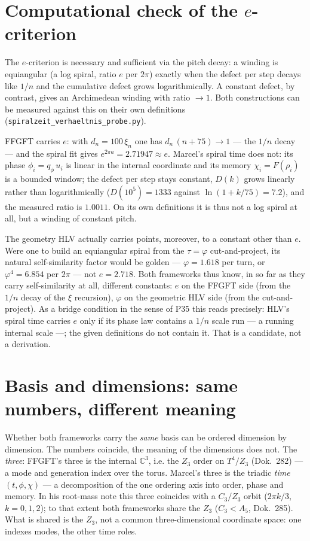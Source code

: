\section{Computational check of the $e$-criterion}
The $e$-criterion is necessary and sufficient via the pitch decay: a winding is equiangular (a log
spiral, ratio $e$ per $2\pi$) exactly when the defect per step decays like $1/n$ and the cumulative
defect grows logarithmically. A constant defect, by contrast, gives an Archimedean winding with
ratio $\to1$. Both constructions can be measured against this on their own definitions
(\texttt{spiralzeit\_verhaeltnis\_probe.py}).

FFGFT carries $e$: with $d_n=100\,\xi_n$ one has $d_n\,(n+75)\to1$ --- the $1/n$ decay --- and the
spiral fit gives $e^{2\pi a}=2{.}71947\approx e$. Marcel's spiral time does not: its phase
$\phi_i=q_\phi\,u_i$ is linear in the internal coordinate and its memory $\chi_i=F(\rho_i)$ is a
bounded window; the defect per step stays constant, $D(k)$ grows linearly rather than
logarithmically ($D(10^5)=1333$ against $\ln(1+k/75)=7{.}2$), and the measured ratio is $1{.}0011$.
On its own definitions it is thus not a log spiral at all, but a winding of constant pitch.

The geometry HLV actually carries points, moreover, to a constant other than $e$. Were one to build
an equiangular spiral from the $\tau=\varphi$ cut-and-project, its natural self-similarity factor
would be golden --- $\varphi=1{.}618$ per turn, or $\varphi^4=6{.}854$ per $2\pi$ --- not
$e=2{.}718$. Both frameworks thus know, in so far as they carry self-similarity at all, different
constants: $e$ on the FFGFT side (from the $1/n$ decay of the $\xi$ recursion), $\varphi$ on the
geometric HLV side (from the cut-and-project). As a bridge condition in the sense of P35 this reads
precisely: HLV's spiral time carries $e$ only if its phase law contains a $1/n$ scale run --- a
running internal scale ---; the given definitions do not contain it. That is a candidate, not a
derivation.

\section{Basis and dimensions: same numbers, different meaning}
Whether both frameworks carry the \emph{same} basis can be ordered dimension by dimension. The
numbers coincide, the meaning of the dimensions does not. The \emph{three}: FFGFT's three is the
internal $\mathbb{C}^3$, i.e. the $Z_3$ order on $T^4/Z_3$ (Dok.~282) --- a mode and generation
index over the torus. Marcel's three is the triadic \emph{time} $(t,\phi,\chi)$ --- a decomposition
of the one ordering axis into order, phase and memory. In his root-mass note this three coincides
with a $C_3/Z_3$ orbit ($2\pi k/3$, $k=0,1,2$); to that extent both frameworks share the $Z_3$
($C_3<A_5$, Dok.~285). What is shared is the $Z_3$, not a common three-dimensional coordinate
space: one indexes modes, the other time roles.

